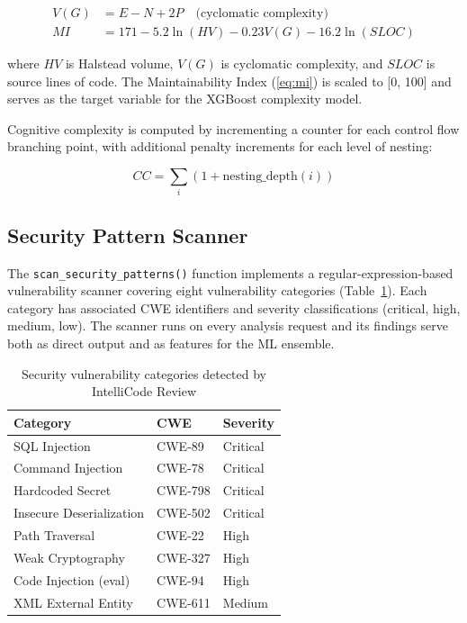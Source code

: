 \documentclass[12pt, oneside]{report}
\begin{document}
\begin{align}
  V(G) &= E - N + 2P \quad \text{(cyclomatic complexity)} \label{eq:cc}\\
  MI &= 171 - 5.2 \ln(HV) - 0.23 V(G) - 16.2 \ln(SLOC) \label{eq:mi}
\end{align}

where $HV$ is Halstead volume, $V(G)$ is cyclomatic complexity, and $SLOC$ is source
lines of code. The Maintainability Index (\ref{eq:mi}) is scaled to [0, 100] and
serves as the target variable for the XGBoost complexity model.

Cognitive complexity is computed by incrementing a counter for each control flow
branching point, with additional penalty increments for each level of nesting:

\begin{equation}
  CC = \sum_{i} (1 + \text{nesting\_depth}(i)) \label{eq:cogcomplexity}
\end{equation}

\subsection{Security Pattern Scanner}

The \texttt{scan\_security\_patterns()} function implements a regular-expression-based
vulnerability scanner covering eight vulnerability categories (Table~\ref{tab:vulntypes}).
Each category has associated CWE identifiers and severity classifications (critical, high,
medium, low). The scanner runs on every analysis request and its findings serve both as
direct output and as features for the ML ensemble.

\begin{table}[H]
\centering
\caption{Security vulnerability categories detected by IntelliCode Review}
\label{tab:vulntypes}
\begin{tabular}{@{}lll@{}}
\toprule
\textbf{Category} & \textbf{CWE} & \textbf{Severity} \\
\midrule
SQL Injection           & CWE-89  & Critical \\
Command Injection       & CWE-78  & Critical \\
Hardcoded Secret        & CWE-798 & Critical \\
Insecure Deserialization & CWE-502 & Critical \\
Path Traversal          & CWE-22  & High \\
Weak Cryptography       & CWE-327 & High \\
Code Injection (eval)   & CWE-94  & High \\
XML External Entity     & CWE-611 & Medium \\
\bottomrule
\end{tabular}
\end{table}
\end{document}
